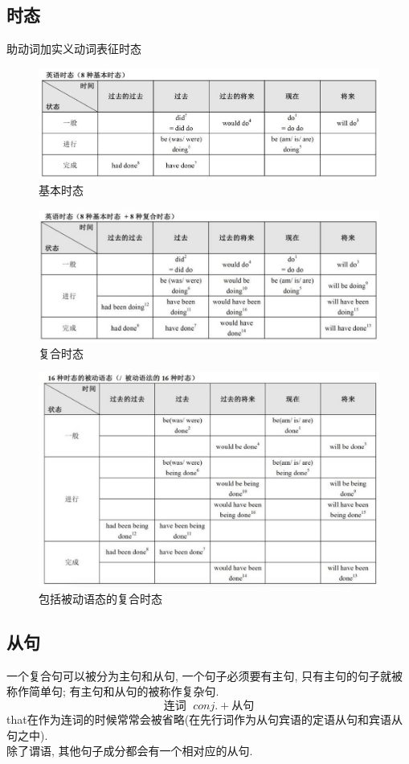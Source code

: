 \documentclass[a4paper]{article}
\begin{document}
\subsection{时态}
助动词加实义动词表征时态
\begin{figure}[h]
\centering
\includegraphics[width=1\textwidth]{tense1.jpg}
\caption{基本时态}
\end{figure}
\begin{figure}[h]
\centering
\includegraphics[width=1\textwidth]{tense2.png}
\caption{复合时态}
\end{figure}
\begin{figure}[h]
\centering
\includegraphics[width=1\textwidth]{tense3.jpg}
\caption{包括被动语态的复合时态}
\end{figure}
\subsection{从句}
一个复合句可以被分为主句和从句, 一个句子必须要有主句, 只有主句的句子就被称作简单句; 有主句和从句的被称作复杂句. \\
$$\text{连词 }\;conj.+\text{从句}$$
that在作为连词的时候常常会被省略(在先行词作为从句宾语的定语从句和宾语从句之中). \\
除了谓语, 其他句子成分都会有一个相对应的从句. 
\end{document}
